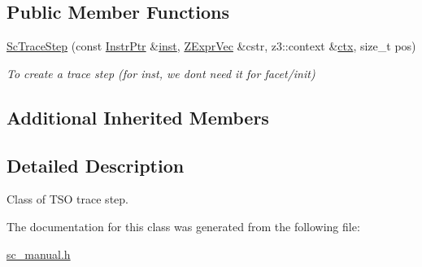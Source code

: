 \subsection*{Public Member Functions}
\begin{DoxyCompactItemize}
\item 
\mbox{\label{classilang_1_1_sc_trace_step_a6bf0155f6c454d6e0da3a8ecc4e6183d}} 
\mbox{\hyperlink{classilang_1_1_sc_trace_step_a6bf0155f6c454d6e0da3a8ecc4e6183d}{Sc\+Trace\+Step}} (const \mbox{\hyperlink{namespaceilang_af88a19312ae653d687a0d1207bb284f6}{Instr\+Ptr}} \&\mbox{\hyperlink{classilang_1_1_trace_step_ad46be2e7ab006f89051c91dd939ece7a}{inst}}, \mbox{\hyperlink{classilang_1_1_trace_step_a19a387426712dbec11dcecf170fb7e1a}{Z\+Expr\+Vec}} \&cstr, z3\+::context \&\mbox{\hyperlink{classilang_1_1_trace_step_afcab3e7a5ce7b619dd445882a9846c93}{ctx}}, size\+\_\+t pos)
\begin{DoxyCompactList}\small\item\em To create a trace step (for inst, we don\textquotesingle{}t need it for facet/init) \end{DoxyCompactList}\end{DoxyCompactItemize}
\subsection*{Additional Inherited Members}


\subsection{Detailed Description}
Class of T\+SO trace step. 

The documentation for this class was generated from the following file\+:\begin{DoxyCompactItemize}
\item 
\mbox{\hyperlink{sc__manual_8h}{sc\+\_\+manual.\+h}}\end{DoxyCompactItemize}
